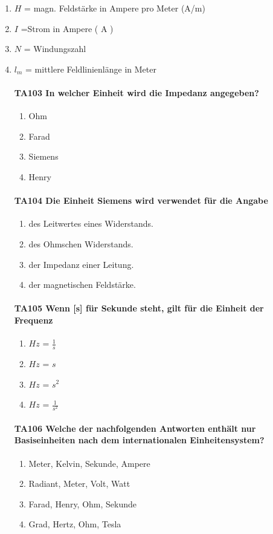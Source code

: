 \documentclass[8pt]{article}
\begin{document}
\begin{enumerate}
\item $H$ = magn. Feldstärke in Ampere pro Meter (A/m)
\item $I$ =Strom in Ampere ( A )
\item $N$ = Windungszahl
\item $l_{m}$ = mittlere Feldlinienlänge in Meter


\paragraph*{TA103 In welcher Einheit wird die Impedanz angegeben?}
\begin{enumerate}[nolistsep,label=\Alph*]
\item Ohm
\item Farad
\item Siemens
\item Henry
\end{enumerate}



\paragraph*{TA104 Die Einheit Siemens wird verwendet für die Angabe}
\begin{enumerate}[nolistsep,label=\Alph*]
\item des Leitwertes eines Widerstands.
\item des Ohmschen Widerstands.
\item der Impedanz einer Leitung.
\item der magnetischen Feldstärke.
\end{enumerate}



\paragraph*{TA105 Wenn [s] für Sekunde steht, gilt für die Einheit der Frequenz}
\begin{enumerate}[nolistsep,label=\Alph*]
\item $Hz$ = $\frac{1}{s}$ 
\item $Hz$ = $s$
\item $Hz$ = $s^{2}$
\item $Hz$ = $\frac{1}{s^{2}}$
\end{enumerate}



\paragraph*{TA106 Welche der nachfolgenden Antworten enthält nur Basiseinheiten nach dem internationalen Einheitensystem?}
\begin{enumerate}[nolistsep,label=\Alph*]
\item Meter, Kelvin, Sekunde, Ampere
\item Radiant, Meter, Volt, Watt
\item Farad, Henry, Ohm, Sekunde
\item Grad, Hertz, Ohm, Tesla
\end{enumerate}




\end{enumerate}
\end{document}
